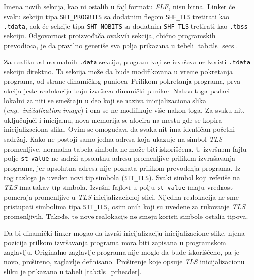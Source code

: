 \documentclass[12pt,oneside]{memoir}
\begin{document}
Imena novih sekcija, kao ni ostalih u fajl formatu \emph{ELF}, nisu bitna. Linker će svaku sekciju tipa \texttt{SHT\_PROGBITS} sa dodatnim flegom \texttt{SHF\_TLS} tretirati kao \texttt{.tdata}, dok će sekcije tipa \texttt{SHT\_NOBITS} sa dodatnim \texttt{SHF\_TLS} tretirati kao \texttt{.tbss} sekciju. Odgovornost proizvođača ovakvih sekcija, obično programskih prevodioca, je da pravilno generiše sva polja prikazana u tebeli \ref{tab:tls_secs}.

Za razliku od normalnih \texttt{.data} sekcija, program koji se izvršava ne koristi \texttt{.tdata} sekciju direktno.  Ta sekcija može da bude modifikovana u vreme pokretanja programa, od strane dinamičkog punioca. Prilikom pokretanja programa, prva akcija jeste realokacija koju izvršava dinamički punilac. Nakon toga podaci lokalni za niti se smeštaju u deo koji se naziva inicijalizaciona slika (\emph{eng.~initialization image}) i ona se ne modifikuje više nakon toga. Za svaku nit, uključujući i inicijalnu, nova memorija se alocira na mestu gde se kopira inicijalizaciona slika. Ovim se omogućava da svaka nit ima identičan početni sadržaj. Kako ne postoji samo jedna adresa koja ukazuje na simbol \emph{TLS} promenljive, normalna tabela simbola ne može biti iskorišćena. U izvršnom fajlu polje \texttt{st\_value} ne sadrži apsolutnu adresu promenljive prilikom izvrašavanja programa, jer apsolutna adresa nije poznata prilikom prevođenja programa. Iz tog razloga  je uveden novi tip simbola (\texttt{STT\_TLS}). Svaki simbol koji referiše na \emph{TLS} ima takav tip simbola. Izvršni fajlovi u polju \texttt{st\_value} imaju vrednost pomeraja promenljive u \emph{TLS} inicijalizacionoj slici.
Nijedna realokacija ne sme pristupati simbolima tipa \texttt{STT\_TLS}, osim onih koji su uvedene za rukovanje \emph{TLS} promenljivih. Takođe, te nove realokacije ne smeju koristi simbole ostalih tipova.

Da bi dinamički linker mogao da izvrši inicijalizaciju inicijalizacione slike, njena pozicija prilkom izvršavanja programa mora biti zapisana u programskom zaglavlju. Originalno zaglavlje programa nije moglo da bude iskorišćeno, pa je novo, prošireno, zaglavlje definisano. Proširenje koje opsuje \emph{TLS} inicijalizacionu sliku je prikazano u tabeli \ref{tab:tls_prheader}.
\end{document}
